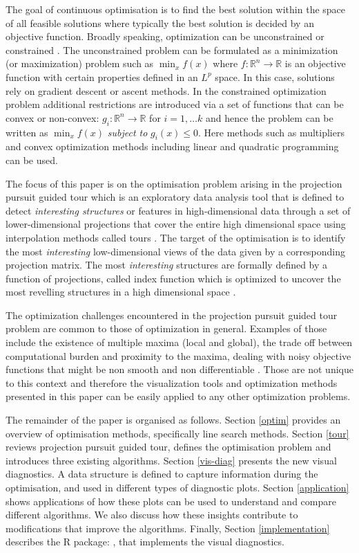 The goal of continuous optimisation is to find the best solution within
the space of all feasible solutions where typically the best solution is
decided by an objective function. Broadly speaking, optimization can be
unconstrained or constrained \citep{kelley1999iterative}. The
unconstrained problem can be formulated as a minimization (or
maximization) problem such as \(\min_{x} f(x)\) where
\(f:\mathbb{R}^n \rightarrow \mathbb{R}\) is an objective function with
certain properties defined in an \(L^p\) space. In this case, solutions
rely on gradient descent or ascent methods. In the constrained
optimization problem additional restrictions are introduced via a set of
functions that can be convex or non-convex:
\(g_i:\mathbb{R}^n \rightarrow \mathbb{R}\) for \(i = 1, \ldots k\) and
hence the problem can be written as \(\min_{x} f(x)\) \emph{subject to}
\(g_i(x) \leq 0\). Here methods such as multipliers and convex
optimization methods including linear and quadratic programming can be
used.

The focus of this paper is on the optimisation problem arising in the
projection pursuit guided tour \citep{buja2005computational} which is an
exploratory data analysis tool that is defined to detect
\emph{interesting structures} or features in high-dimensional data
through a set of lower-dimensional projections that cover the entire
high dimensional space using interpolation methods called tours
\citep{cook2008grand}. The target of the optimisation is to identify the
most \emph{interesting} low-dimensional views of the data given by a
corresponding projection matrix. The most \emph{interesting} structures
are formally defined by a function of projections, called index function
which is optimized to uncover the most revelling structures in a high
dimensional space \citep{cook1993projection}.

The optimization challenges encountered in the projection pursuit guided
tour problem are common to those of optimization in general. Examples of
those include the existence of multiple maxima (local and global), the
trade off between computational burden and proximity to the maxima,
dealing with noisy objective functions that might be non smooth and non
differentiable \citep{jones1998efficient}. Those are not unique to this
context and therefore the visualization tools and optimization methods
presented in this paper can be easily applied to any other optimization
problems.

The remainder of the paper is organised as follows. Section \ref{optim}
provides an overview of optimisation methods, specifically line search
methods. Section \ref{tour} reviews projection pursuit guided tour,
defines the optimisation problem and introduces three existing
algorithms. Section \ref{vis-diag} presents the new visual diagnostics.
A data structure is defined to capture information during the
optimisation, and used in different types of diagnostic plots. Section
\ref{application} shows applications of how these plots can be used to
understand and compare different algorithms. We also discuss how these
insights contribute to modifications that improve the algorithms.
Finally, Section \ref{implementation} describes the R package:
, that implements the visual diagnostics.

